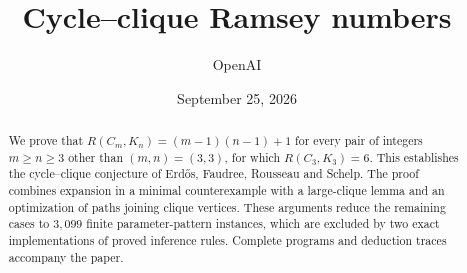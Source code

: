 \documentclass[11pt]{article}
\title{Cycle--clique Ramsey numbers}
\author{OpenAI}
\date{September 25, 2026}
\theoremstyle{definition}
\numberwithin{equation}{section}
\begin{document}
\maketitle
\begin{abstract}
We prove that $R(C_m,K_n)=(m-1)(n-1)+1$ for every pair of integers
$m\ge n\ge3$ other than $(m,n)=(3,3)$, for which $R(C_3,K_3)=6$.
This establishes the cycle--clique conjecture of Erd\H{o}s, Faudree,
Rousseau and Schelp. The proof combines expansion in a
minimal counterexample with a large-clique lemma and an optimization of
paths joining clique vertices. These arguments reduce the remaining cases
to $3{,}099$ finite parameter-pattern instances, which are excluded by two exact
implementations of proved inference rules. Complete programs and deduction
traces accompany the paper.
\end{abstract}
\tableofcontents















\appendix



\end{document}
